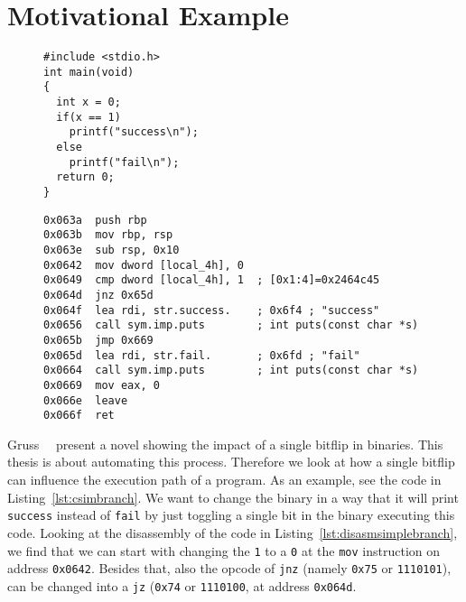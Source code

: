 \section{Motivational Example}\label{sec:motivation}

\begin{figure}
\begin{minipage}{\linewidth}
\begin{lstlisting}[style=CStyle,
                   caption={Simple branching code to illustrate how a single
bitflip can change the execution path.},
                   label={lst:csimbranch}]
#include <stdio.h>
int main(void)
{
  int x = 0;
  if(x == 1)
    printf("success\n");
  else
    printf("fail\n");
  return 0;
}
\end{lstlisting}
\end{minipage}
\end{figure}

\begin{figure}
\begin{minipage}{\linewidth}
\begin{lstlisting}[style=nasm,
                   caption={Disassemby of the main function created by the
code in Listing~\ref{lst:csimbranch}. Shows disassembly at the given address
range inside the ELF file, starting at \texttt{0x063a}.},
                   label={lst:disasmsimplebranch}]
0x063a  push rbp
0x063b  mov rbp, rsp
0x063e  sub rsp, 0x10
0x0642  mov dword [local_4h], 0
0x0649  cmp dword [local_4h], 1  ; [0x1:4]=0x2464c45
0x064d  jnz 0x65d
0x064f  lea rdi, str.success.    ; 0x6f4 ; "success"
0x0656  call sym.imp.puts        ; int puts(const char *s)
0x065b  jmp 0x669
0x065d  lea rdi, str.fail.       ; 0x6fd ; "fail"
0x0664  call sym.imp.puts        ; int puts(const char *s)
0x0669  mov eax, 0
0x066e  leave
0x066f  ret
\end{lstlisting}
\end{minipage}
\end{figure}

Gruss~\etal~\cite{flipinthewall} present a novel showing the impact of a single
bitflip in binaries. This thesis is about automating this process. Therefore we
look at how a single bitflip can influence the execution path of a program. As
an example, see the code in Listing~\ref{lst:csimbranch}. We want to change the
binary in a way that it will print \texttt{success} instead of \texttt{fail} by
just toggling a single bit in the binary executing this code. Looking at the
disassembly of the code in Listing~\ref{lst:disasmsimplebranch}, we find that we
can start with changing the \texttt{1} to a \texttt{0} at the \texttt{mov}
instruction on address \texttt{0x0642}. Besides that, also the opcode of
\texttt{jnz} (namely \texttt{0x75}  or \texttt{1110101}), can be changed into a
\texttt{jz} (\texttt{0x74} or \texttt{1110100}, at address \texttt{0x064d}.

